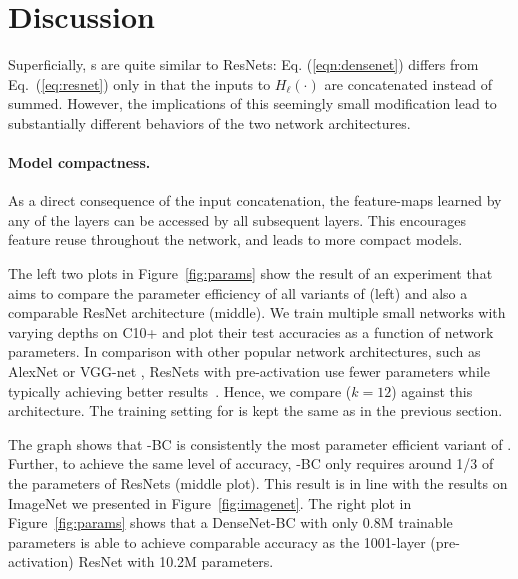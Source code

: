 \section{Discussion}


Superficially, \methodnameshort{}s are quite similar to ResNets: Eq. (\ref{eqn:densenet}) differs from Eq.~(\ref{eq:resnet}) only in that the inputs to $H_\ell(\cdot)$ are concatenated instead of summed. However, the implications of this seemingly small modification lead to substantially different behaviors of the two network architectures.

\vspace{-2ex}
\paragraph{Model compactness.}
As a direct consequence of the input concatenation, the feature-maps learned by any of the \methodnameshort{} layers can be accessed by all subsequent layers. This encourages feature reuse throughout the network, and leads to more compact models.

The left two plots in Figure~\ref{fig:params} show the result of an experiment that aims to compare the parameter efficiency of all variants of \methodnameshorts{} (left) and also a comparable ResNet architecture (middle).
We train multiple small networks with varying depths on C10+ and plot their test accuracies as a function of network parameters.
In comparison with other popular network architectures, such as AlexNet \cite{alexnet} or VGG-net \cite{vgg}, ResNets with pre-activation use fewer parameters while typically achieving better results~\cite{identity-mappings}. Hence, we compare \methodnameshort{} ($k=12$) against this architecture. The training setting for \methodnameshort{} is kept the same as in the previous section.

The graph shows that \methodnameshort{}-BC is consistently the most parameter efficient variant of \methodnameshort{}.
Further, to achieve the same level of accuracy, \methodnameshort{}-BC only requires around 1/3 of the parameters of ResNets (middle plot). This result is in line with the results on ImageNet we presented in Figure~\ref{fig:imagenet}. The right plot in Figure~\ref{fig:params} shows that a DenseNet-BC with only 0.8M trainable parameters is able to achieve comparable accuracy as the 1001-layer (pre-activation) ResNet \cite{identity-mappings} with 10.2M parameters.

